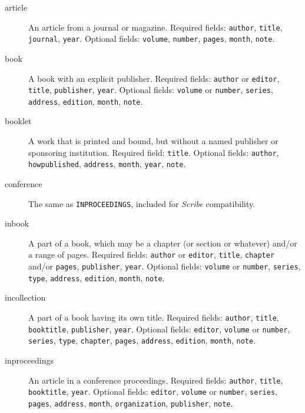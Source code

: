 \begin{description}
\sloppy

\item[article\hfill] An article from a journal or magazine.
Required fields: \hbox{\tt author}, \hbox{\tt title}, \hbox{\tt journal},
\hbox{\tt year}.
Optional fields: \hbox{\tt volume}, \hbox{\tt number},
\hbox{\tt pages}, \hbox{\tt month}, \hbox{\tt note}.

\item[book\hfill] A book with an explicit publisher.
Required fields: \hbox{\tt author} or \hbox{\tt editor},
\hbox{\tt title}, \hbox{\tt publisher}, \hbox{\tt year}.
Optional fields: \hbox{\tt volume} or \hbox{\tt number}, \hbox{\tt series},
\hbox{\tt address}, \hbox{\tt edition}, \hbox{\tt month},
\hbox{\tt note}.

\item[booklet\hfill] A work that is printed and bound,
but without a named publisher or sponsoring institution.
Required field: \hbox{\tt title}.
Optional fields: \hbox{\tt author}, \hbox{\tt howpublished},
\hbox{\tt address}, \hbox{\tt month}, \hbox{\tt year}, \hbox{\tt note}.

\item[conference\hfill] The same as {\tt INPROCEEDINGS},
included for {\em Scribe\/} compatibility.

\item[inbook\hfill] A part of a book,
which may be a chapter (or section or whatever) and/or a range of pages.
Required fields: \hbox{\tt author} or \hbox{\tt editor}, \hbox{\tt title},
\hbox{\tt chapter} and/or \hbox{\tt pages}, \hbox{\tt publisher},
\hbox{\tt year}.
Optional fields: \hbox{\tt volume} or \hbox{\tt number}, \hbox{\tt series},
\hbox{\tt type}, \hbox{\tt address},
\hbox{\tt edition}, \hbox{\tt month}, \hbox{\tt note}.

\item[incollection\hfill] A part of a book having its own title.
Required fields: \hbox{\tt author}, \hbox{\tt title}, \hbox{\tt booktitle},
\hbox{\tt publisher}, \hbox{\tt year}.
Optional fields: \hbox{\tt editor}, \hbox{\tt volume} or \hbox{\tt number},
\hbox{\tt series}, \hbox{\tt type}, \hbox{\tt chapter}, \hbox{\tt pages},
\hbox{\tt address}, \hbox{\tt edition}, \hbox{\tt month}, \hbox{\tt note}.

\item[inproceedings\hfill] An article in a conference proceedings.
Required fields: \hbox{\tt author}, \hbox{\tt title}, \hbox{\tt booktitle},
\hbox{\tt year}.
Optional fields: \hbox{\tt editor}, \hbox{\tt volume} or \hbox{\tt number},
\hbox{\tt series}, \hbox{\tt pages}, \hbox{\tt address}, \hbox{\tt month},
\hbox{\tt organization}, \hbox{\tt publisher}, \hbox{\tt note}.


\end{description}
